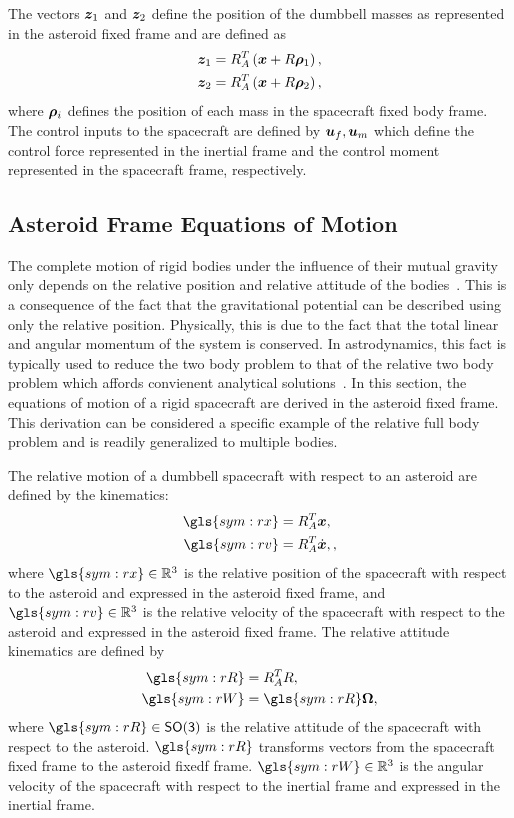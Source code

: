 The vectors \( \bm{z}_1 \) and \( \bm{z}_2\) define the position of the dumbbell masses as represented in the asteroid fixed frame and are defined as
\begin{align}
    \bm{z}_1 &= R_A^T \left( \bm{x} + R \bm{\rho}_1 \right) , \\
    \bm{z}_2 &= R_A^T \left( \bm{x} + R \bm{\rho}_2 \right), 
\end{align}
where \( \bm{\rho}_i \) defines the position of each mass in the spacecraft fixed body frame.
The control inputs to the spacecraft are defined by \( \bm{u}_f, \bm{u}_m \) which define the control force represented in the inertial frame and the control moment represented in the spacecraft frame, respectively. 
\subsection{Asteroid Frame Equations of Motion}
The complete motion of rigid bodies under the influence of their mutual gravity only depends on the relative position and relative attitude of the bodies~\cite{lee2007a}.
This is a consequence of the fact that the gravitational potential can be described using only the relative position.
Physically, this is due to the fact that the total linear and angular momentum of the system is conserved.
In astrodynamics, this fact is typically used to reduce the two body problem to that of the relative two body problem which affords convienent analytical solutions~\cite{vallado2007,bate1971}.
In this section, the equations of motion of a rigid spacecraft are derived in the asteroid fixed frame.
This derivation can be considered a specific example of the relative full body problem and is readily generalized to multiple bodies.


The relative motion of a dumbbell spacecraft with respect to an asteroid are defined by the kinematics:
\begin{align}
    \gls{sym:rx} &= R_A^T \vc{x}, \label{eq:relative_position} \\
    \gls{sym:rv} &= R_A^T \dot{\vc{x}}, \label{eq:relative_velocity},
\end{align}
where \( \gls{sym:rx} \in \R^3 \) is the relative position of the spacecraft with respect to the asteroid and expressed in the asteroid fixed frame, and \( \gls{sym:rv} \in \R^3 \) is the relative velocity of the spacecraft with respect to the asteroid and expressed in the asteroid fixed frame.
The relative attitude kinematics are defined by
\begin{align}
    \gls{sym:rR} &= R_A^T R, \label{eq:relative_attitude} \\
    \gls{sym:rW} &= \gls{sym:rR} \vc{\Omega}, \label{eq:relative_angular_velocity}
\end{align}
where \( \gls{sym:rR} \in \SO \) is the relative attitude of the spacecraft with respect to the asteroid.
\( \gls{sym:rR} \) transforms vectors from the spacecraft fixed frame to the asteroid fixedf frame.
\( \gls{sym:rW} \in \R^3 \) is the angular velocity of the spacecraft with respect to the inertial frame and expressed in the inertial frame.


